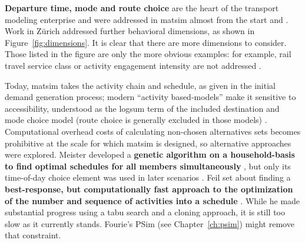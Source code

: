 
\textbf{Departure time, mode and route choice} are the heart of the transport modeling enterprise and were addressed in \gls{matsim} almost from the start \citep{RaneyNagel2004agdb} and \citep{BalmerRaneyEtAl2005act-times,RieserGretherNagel2008modeChoiceCalculations}.
%
Work in Zürich addressed further behavioral dimensions, 
as shown in Figure~\ref{fig:dimensions}.
It is clear that there are more dimensions to consider. Those listed in the figure are only the more obvious examples: for example, rail travel service class or activity engagement intensity are not addressed . 

Today, \gls{matsim} takes the activity chain and schedule, as given in the initial demand generation process; modern ``activity based-models'' make it sensitive to accessibility, understood as the logsum term of the included destination and mode choice model (route choice is generally excluded in those models) \citep[see][for an early example]{BenAkivaEtAl_Transportation_1996}.
Computational overhead costs of calculating non-chosen alternatives sets becomes prohibitive at the scale for which \gls{matsim} is designed,
 so alternative approaches were explored. 
%
Meister developed a \textbf{genetic algorithm on a household-basis to find optimal schedules for all members simultaneously} \citep[reported in][]{MeisterEtAl_Transportation_2005},
but only its time-of-day choice element was used in later scenarios \citep{MeisterBalmerEtc2006planomatIatbr}.
%
Feil set about finding a \textbf{best-response, but computationally fast approach to the optimization of the number and sequence of activities into a schedule} \citep[][]{Feil_PhDThesis_2010}. While he made substantial progress using a tabu search and a cloning approach, it is still too slow as it currently stands. Fourie's PSim (see Chapter~\ref{ch:psim}) might remove that constraint.

